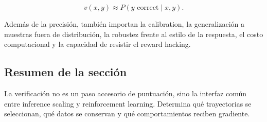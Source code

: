 $$
v(x,y)\approx P(y\text{ correct}\mid x,y).
$$

Además de la precisión, también importan la calibration, la generalización a muestras fuera de distribución, la robustez frente al estilo de la respuesta, el costo computacional y la capacidad de resistir el reward hacking.

\subsection{Resumen de la sección}

La verificación no es un paso accesorio de puntuación, sino la interfaz común entre inference scaling y reinforcement learning. Determina qué trayectorias se seleccionan, qué datos se conservan y qué comportamientos reciben gradiente.

